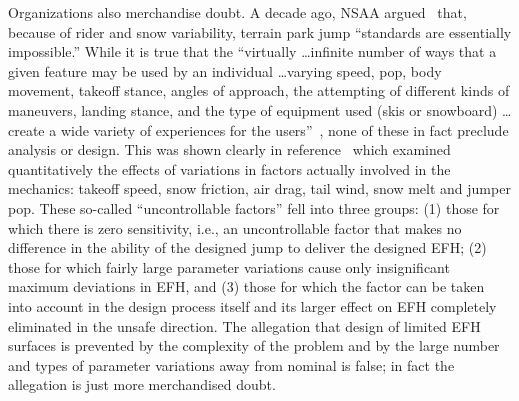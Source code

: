 \documentclass[smallextended]{svjour3}       %
\begin{document}
Organizations also merchandise doubt. A decade ago, NSAA argued~\cite{NSAA2008}
that, because of rider and snow variability, terrain park jump ``standards are
essentially impossible.'' While it is true that the ``virtually \ldots infinite number of
ways that a given feature may be used by an individual \ldots varying speed,
pop, body movement, takeoff stance, angles of approach, the attempting of
different kinds of maneuvers, landing stance, and the type of equipment used
(skis or snowboard) \ldots create a wide variety of experiences for the
users''~\cite{NSAA2008}, none of these in fact preclude analysis or design.
This was shown clearly in reference~\cite{Hubbard2012} which examined
quantitatively the effects of variations in factors actually involved in the
mechanics: takeoff speed, snow friction, air drag, tail wind, snow melt and
jumper pop. These so-called ``uncontrollable factors'' fell into three groups:
(1) those for which there is zero sensitivity, i.e., an uncontrollable factor
that makes no difference in the ability of the designed jump to deliver the
designed EFH; (2) those for which fairly large parameter variations cause only
insignificant maximum deviations in EFH, and (3) those for which the factor can
be taken into account in the design process itself and its larger effect on EFH
completely eliminated in the unsafe direction. The allegation that design of
limited EFH surfaces is prevented by the complexity of the problem and by the
large number and types of parameter variations away from nominal is false; in
fact the allegation is just more merchandised doubt.

\end{document}
